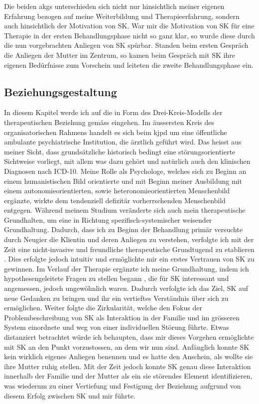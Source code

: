 Die beiden \acp{akg} unterschieden sich nicht nur hinsichtlich meiner eigenen Erfahrung bezogen auf meine Weiterbildung und Therapieerfahrung, sondern auch hinsichtlich der Motivation von SK. War mir die Motivation von SK für eine Therapie in der ersten Behandlungsphase nicht so ganz klar, so wurde diese durch die nun vorgebrachten Anliegen von SK spürbar. Standen beim ersten Gespräch die Anliegen der Mutter im Zentrum, so kamen beim Gespräch mit SK ihre eigenen Bedürfnisse zum Vorschein und leiteten die zweite Behandlungsphase ein. 

\subsection{Beziehungsgestaltung} \label{lbBeziehungsgestaltung}  
In diesem Kapitel werde ich auf die  in Form des Drei-Kreis-Modells der therapeutischen Beziehung gemäss  eingehen. Im äussersten Kreis des organisatorischen Rahmens handelt es sich beim \ac{kjpd} um eine öffentliche ambulante psychiatrische Institution, die ärztlich geführt wird. Das heisst aus meiner Sicht, dass grundsätzliche historisch bedingt eine störungsorientierte Sichtweise vorliegt, mit allem was dazu gehört und natürlich auch den klinischen Diagnosen nach ICD-10. Meine Rolle als Psychologe, welches sich zu Beginn an einem humanistischen Bild orientierte und mit Beginn meiner Ausbildung mit einem autonomieorientierten, sowie heteronomieorientierten Menschenbild ergänzte, wirkte dem tendenziell defizitär vorherrschenden Menschenbild entgegen. Während meinem Studium veränderte sich auch mein therapeutische Grundhalten, um eine in Richtung spezifisch-systemischer weisender Grundhaltung. Dadurch, dass ich zu Beginn der Behandlung primär versuchte durch Neugier die Klientin und deren Anliegen zu verstehen, verfolgte ich mit der Zeit eine nicht-invasive und freundliche therapeutische Grundtugend zu etablieren \cite{Cecchin1988}. Dies erfolgte jedoch intuitiv und ermöglichte mir ein erstes Vertrauen von SK zu gewinnen. Im Verlauf der Therapie ergänzte ich meine Grundhaltung, indem ich hypothesengeleitete Fragen zu stellen begann \cite{Andersen1990}, die für SK interessant und angemessen, jedoch ungewöhnlich waren. Dadurch verfolgte ich das Ziel, SK auf neue Gedanken zu bringen und ihr ein vertieftes Verständnis über sich zu ermöglichen. Weiter folgte die Zirkularität, welche den Fokus der Problembeschreibung von SK als Interaktion in der Familie und im grösseren System einordnete und weg von einer individuellen Störung führte. Etwas distanziert betrachtet würde ich behaupten, dass mir dieses Vorgehen ermöglichte mit SK an den Punkt vorzustossen, an dem wir nun sind. Anfänglich konnte SK kein wirklich eigenes Anliegen benennen und es hatte den Anschein, als wollte sie ihre Mutter ruhig stellen. Mit der Zeit jedoch konnte SK genau diese Interaktion innerhalb der Familie und der Mutter als ein sie störendes Element identifizieren, was wiederum zu einer Vertiefung und Festigung der Beziehung aufgrund von diesem Erfolg zwischen SK und mir führte.

